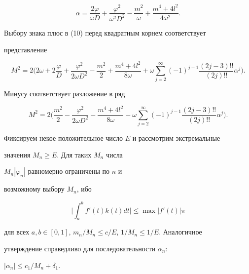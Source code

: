 \begin{pf}
$$


\alpha=\frac{2\varphi}{\omega D}+\frac{\varphi^2}{


\omega^2 D^2} - \frac{m^2}{\omega}+\frac{m^4+4 l^2}{4\omega^2}.


$$


Выбору знака плюс в (10) перед квадратным корнем соответствует


представление


\begin{equation}


M^2=2\bigg(2 \omega + 2\frac{\varphi}{D} +


\frac{\varphi^2}{2 \omega D^2} -\frac{m^2}{2}+ \frac{m^4+4 l^2}{8


\omega}+\omega\sum^\infty_{j=2}


(-1)^{j-1} \frac{(2j-3)!!}{(2j)!!}


\alpha^j \bigg).


\end{equation}


Минусу соответствует разложение в ряд


\begin{equation}


M^2=2\bigg(\frac{m^2}{2}-\frac{\varphi^2}{2 \omega D^2}-


\frac{m^4+4 l^2}{8 \omega}-


\omega\sum_{j=2}^{\infty}(-1)^{j-1}\frac{(2j-3)!!}{(2j)!!}\alpha^j\bigg).


\end{equation}





Фиксируем некое положительное число $E$ и рассмотрим экстремальные


значения $M_n\geq E$. Для таких $M_n$ числа


$M_n|{\varphi_n}|$ равномерно ограничены по $n$ и


возможному выбору $M_n$, ибо


$$


\bigg|{\int_a^b {f'(t)k(t)dt}} \bigg| \leq \max| {f'(t)}|\pi


$$


для всех $a,b\in [0,1]$, $m_n/M_n \leq c/E$, $1/M_n \le 1/E$. Аналогичное


утверждение справедливо для последовательности $\alpha_n$:


$|{\alpha_n}| \le c_1/M_n+\delta_1$.






\end{pf}
